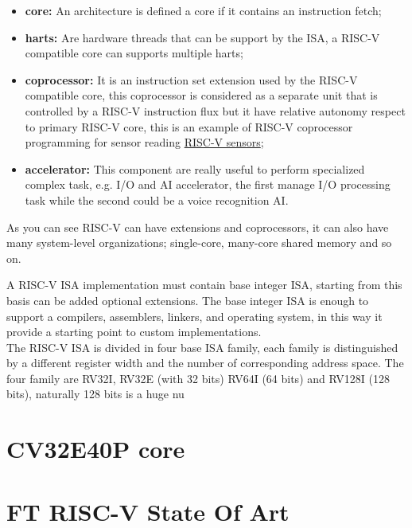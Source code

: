{{	    \begin{itemize}
	        \item \textbf{core:} An architecture is defined a core if it contains an instruction fetch; 
	        \item \textbf{harts:} Are hardware threads that can be support by the ISA, a RISC-V compatible core can supports multiple harts;
	        \item \textbf{coprocessor:} It is an instruction set extension used by the RISC-V compatible core, this coprocessor is considered as a separate unit that is controlled by a RISC-V instruction flux but it have relative autonomy respect to primary RISC-V core, this is an example of RISC-V coprocessor programming for sensor reading \href{https://github.com/espressif/esp-idf/blob/c13afea635adec735435961270d0894ff46eef85/docs/en/api-guides/ulp-risc-v.rst}{RISC-V sensors};
	        \item \textbf{accelerator:} This component are really useful to perform specialized complex task, e.g. I/O and AI accelerator, the first manage I/O processing task while the second could be a voice recognition AI.
	    \end{itemize}
	    As you can see RISC-V can have extensions and coprocessors, it can also have many system-level organizations; single-core, many-core shared memory and so on.
	    
	    
	    A RISC-V ISA implementation must contain base integer ISA, starting from this basis can be added optional extensions. 
	    The base integer ISA is enough to support a compilers, assemblers, linkers, and operating system, in this way it provide a starting point to custom implementations.\\
	    
	    The RISC-V ISA is divided in four base ISA family, each family is distinguished by a different register width and the number of corresponding address space. 
	    The four family are RV32I, RV32E (with 32 bits) RV64I (64 bits) and RV128I (128 bits), naturally 128 bits is a huge nu
	}%
	
	\section{CV32E40P core}{
		
	}%

	\section{FT RISC-V State Of Art}{
		
	}%

}